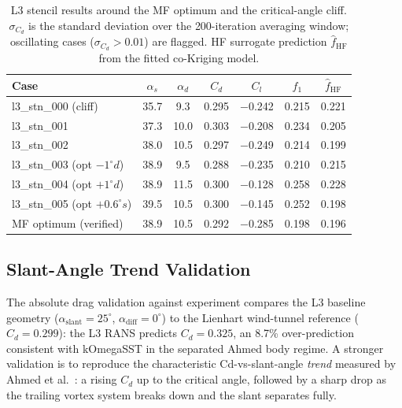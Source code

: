\begin{table}[h]
  \centering
  \caption{L3 stencil results around the MF optimum and the critical-angle cliff. $\sigma_{C_d}$ is the standard deviation over the 200-iteration averaging window; oscillating cases ($\sigma_{C_d}>0.01$) are flagged. HF surrogate prediction $\hat{f}_\mathrm{HF}$ from the fitted co-Kriging model.}
  \label{tab:stencil_results}
  \begin{tabular}{lcccccc}
    \toprule
    Case & $\alpha_s$ & $\alpha_d$ & $C_d$ & $C_l$ & $f_1$ & $\hat{f}_\mathrm{HF}$ \\
    \midrule
    l3\_stn\_000 (cliff)      & 35.7 &  9.3 & 0.295 & $-$0.242 & 0.215 & 0.221 \\
    l3\_stn\_001              & 37.3 & 10.0 & 0.303 & $-$0.208 & 0.234 & 0.205 \\
    l3\_stn\_002              & 38.0 & 10.5 & 0.297 & $-$0.249 & 0.214 & 0.199 \\
    l3\_stn\_003 (opt $-1^\circ d$) & 38.9 &  9.5 & 0.288 & $-$0.235 & 0.210 & 0.215 \\
    l3\_stn\_004 (opt $+1^\circ d$) & 38.9 & 11.5 & 0.300 & $-$0.128 & 0.258 & 0.228 \\
    l3\_stn\_005 (opt $+0.6^\circ s$) & 39.5 & 10.5 & 0.300 & $-$0.145 & 0.252 & 0.198 \\
    \midrule
    MF optimum (verified)     & 38.9 & 10.5 & 0.292 & $-$0.285 & 0.198 & 0.196 \\
    \bottomrule
  \end{tabular}
\end{table}

\subsection{Slant-Angle Trend Validation}
\label{sec:slant_trend}

The absolute drag validation against experiment compares the L3 baseline geometry ($\alpha_\mathrm{slant}=25^\circ$, $\alpha_\mathrm{diff}=0^\circ$) to the Lienhart wind-tunnel reference ($C_d=0.299$): the L3 RANS predicts $C_d=0.325$, an 8.7\% over-prediction consistent with kOmegaSST in the separated Ahmed body regime. A stronger validation is to reproduce the characteristic Cd-vs-slant-angle \emph{trend} measured by Ahmed et al.~\cite{ahmed1984}: a rising $C_d$ up to the critical angle, followed by a sharp drop as the trailing vortex system breaks down and the slant separates fully.

